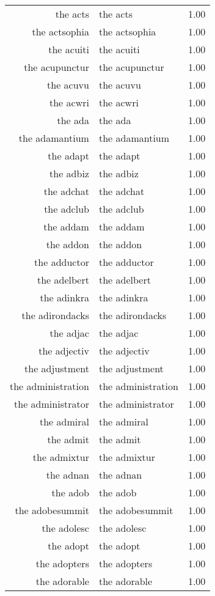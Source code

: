 \begin{table}[ht]
\begin{tabular}{rlr}
  the acts & the acts & 1.00 \\ 
  the actsophia & the actsophia & 1.00 \\ 
  the acuiti & the acuiti & 1.00 \\ 
  the acupunctur & the acupunctur & 1.00 \\ 
  the acuvu & the acuvu & 1.00 \\ 
  the acwri & the acwri & 1.00 \\ 
  the ada & the ada & 1.00 \\ 
  the adamantium & the adamantium & 1.00 \\ 
  the adapt & the adapt & 1.00 \\ 
  the adbiz & the adbiz & 1.00 \\ 
  the adchat & the adchat & 1.00 \\ 
  the adclub & the adclub & 1.00 \\ 
  the addam & the addam & 1.00 \\ 
  the addon & the addon & 1.00 \\ 
  the adductor & the adductor & 1.00 \\ 
  the adelbert & the adelbert & 1.00 \\ 
  the adinkra & the adinkra & 1.00 \\ 
  the adirondacks & the adirondacks & 1.00 \\ 
  the adjac & the adjac & 1.00 \\ 
  the adjectiv & the adjectiv & 1.00 \\ 
  the adjustment & the adjustment & 1.00 \\ 
  the administration & the administration & 1.00 \\ 
  the administrator & the administrator & 1.00 \\ 
  the admiral & the admiral & 1.00 \\ 
  the admit & the admit & 1.00 \\ 
  the admixtur & the admixtur & 1.00 \\ 
  the adnan & the adnan & 1.00 \\ 
  the adob & the adob & 1.00 \\ 
  the adobesummit & the adobesummit & 1.00 \\ 
  the adolesc & the adolesc & 1.00 \\ 
  the adopt & the adopt & 1.00 \\ 
  the adopters & the adopters & 1.00 \\ 
  the adorable & the adorable & 1.00 \\ 

\end{tabular}
\end{table}
